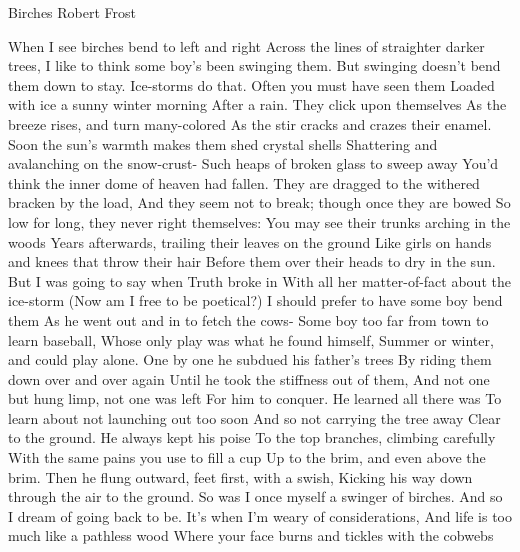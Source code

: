 \begin{poem}
{Birches}
{Robert Frost}

     When I see birches bend to left and right                    
     Across the lines of straighter darker trees, 		  
     I like to think some boy's been swinging them. 		  
     But swinging doesn't bend them down to stay. 		  
     Ice-storms do that. Often you must have seen them 		  
     Loaded with ice a sunny winter morning 			  
     After a rain. They click upon themselves 			  
     As the breeze rises, and turn many-colored 		  
     As the stir cracks and crazes their enamel. 		  
     Soon the sun's warmth makes them shed crystal shells 	  
     Shattering and avalanching on the snow-crust- 		  
     Such heaps of broken glass to sweep away 			  
     You'd think the inner dome of heaven had fallen. 		  
     They are dragged to the withered bracken by the load, 	  
     And they seem not to break; though once they are bowed 	  
     So low for long, they never right themselves: 		  
     You may see their trunks arching in the woods 		  
     Years afterwards, trailing their leaves on the ground 	  
     Like girls on hands and knees that throw their hair 	  
     Before them over their heads to dry in the sun. 		  
     But I was going to say when Truth broke in 		  
     With all her matter-of-fact about the ice-storm 		  
     (Now am I free to be poetical?) 				  
     I should prefer to have some boy bend them 		  
     As he went out and in to fetch the cows- 			  
     Some boy too far from town to learn baseball, 		  
     Whose only play was what he found himself, 		  
     Summer or winter, and could play alone. 			  
     One by one he subdued his father's trees 			  
     By riding them down over and over again 			  
     Until he took the stiffness out of them, 			  
     And not one but hung limp, not one was left 		  
     For him to conquer. He learned all there was 		  
     To learn about not launching out too soon 			  
     And so not carrying the tree away 				  
     Clear to the ground. He always kept his poise 		  
     To the top branches, climbing carefully 			  
     With the same pains you use to fill a cup 			  
     Up to the brim, and even above the brim. 			  
     Then he flung outward, feet first, with a swish, 		  
     Kicking his way down through the air to the ground. 	  
     So was I once myself a swinger of birches. 		  
     And so I dream of going back to be. 			  
     It's when I'm weary of considerations, 			  
     And life is too much like a pathless wood 			  
     Where your face burns and tickles with the cobwebs 	  

\end{poem}
